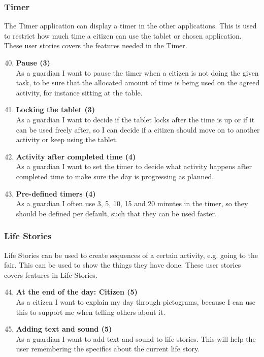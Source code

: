\subsubsection{Timer}
The Timer application can display a timer in the other applications. This is used to restrict how much time a citizen can use the tablet or chosen application. These user stories covers the features needed in the Timer.

\begin{enumerate}
	\setcounter{enumi}{39} %
	\item \textbf{Pause (3)}\\
	As a guardian I want to pause the timer when a citizen is not doing the given task, to be sure that the allocated amount of time is being used on the agreed activity, for instance sitting at the table.
	
	\item \textbf{Locking the tablet (3)}\\
	As a guardian I want to decide if the tablet locks after the time is up or if it can be used freely after, so I can decide if a citizen should move on to another activity or keep using the tablet.
	
	\item \textbf{Activity after completed time (4)}\\
	As a guardian I want to set the timer to decide what activity happens after completed time to make sure the day is progressing as planned.
	
	\item \textbf{Pre-defined timers (4)}\\
	As a guardian I often use 3, 5, 10, 15 and 20 minutes in the timer, so they should be defined per default, such that they can be used faster.
\end{enumerate}

\subsubsection{Life Stories}
Life Stories can be used to create sequences of a certain activity, e.g. going to the fair. This can be used to show the things they have done. These user stories covers features in Life Stories.

\begin{enumerate}
	\setcounter{enumi}{43} %
	\item \textbf{At the end of the day: Citizen (5)}\\
	As a citizen I want to explain my day through pictograms, because I can use this to support me when telling others about it.
	
	\item \textbf{Adding text and sound (5)}\\
	As a guardian I want to add text and sound to life stories. This will help the user remembering the specifics about the current life story.
\end{enumerate}

